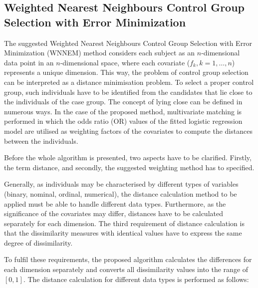 		\subsection{Weighted Nearest Neighbours Control Group Selection with Error Minimization}
		\label{sec:wnnem}
								
								
		The suggested Weighted Nearest Neighbours Control Group Selection with Error Minimization (WNNEM) method \cite{szeker2020weighted} considers each subject as an $n$-dimensional data point in an $n$-dimensional space, where each covariate ($f_k, k=1, \dots, n$) represents a unique dimension. This way, the problem of control group selection can be interpreted as a distance minimisation problem. To select a proper control group, such individuals have to be identified from the candidates that lie close to the individuals of the case group. The concept of lying close can be defined in numerous ways. In the case of the proposed method, multivariate matching is performed in which the odds ratio (OR) values of the fitted logistic regression model are utilised as weighting factors of the covariates to compute the distances between the individuals.
								
		Before the whole algorithm is presented, two aspects have to be clarified. Firstly, the term distance, and secondly, the suggested weighting method has to specified.
								
		Generally, as individuals may be characterised by different types of variables (binary, nominal, ordinal, numerical), the distance calculation method to be applied must be able to handle different data types. Furthermore, as the significance of the covariates may differ, distances have to be calculated separately for each dimension. The third requirement of distance calculation is that the dissimilarity measures with identical values have to express the same degree of dissimilarity. 
								
		To fulfil these requirements, the proposed algorithm calculates the differences for each dimension separately and converts all dissimilarity values into the range of $[0,1]$. The distance calculation for different data types is performed as follows:
								
